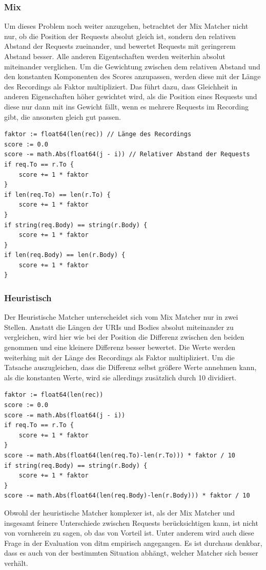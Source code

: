 \documentclass[12pt,a4paper]{report}
\begin{document}
\subsubsection{Mix}
Um dieses Problem noch weiter anzugehen, betrachtet der Mix Matcher nicht nur, ob die Position der Requests absolut gleich
ist, sondern den relativen Abstand der Requests zueinander, und bewertet Requests mit geringerem Abstand besser. Alle
anderen Eigentschaften werden weiterhin absolut miteinander verglichen. Um die Gewichtung zwischen dem relativen Abstand
und den konstanten Komponenten des Scores anzupassen, werden diese mit der Länge des Recordings als Faktor multipliziert.
Das führt dazu, dass Gleichheit in anderen Eigenschaften höher gewichtet wird, als die Position eines Requests und diese
nur dann mit ins Gewicht fällt, wenn es mehrere Requests im Recording gibt, die ansonsten gleich gut passen.
\begin{verbatim}
faktor := float64(len(rec)) // Länge des Recordings
score := 0.0
score -= math.Abs(float64(j - i)) // Relativer Abstand der Requests
if req.To == r.To {
    score += 1 * faktor
}
if len(req.To) == len(r.To) {
    score += 1 * faktor
}
if string(req.Body) == string(r.Body) {
    score += 1 * faktor
}
if len(req.Body) == len(r.Body) {
    score += 1 * faktor
}
\end{verbatim}
\subsubsection{Heuristisch}
Der Heuristische Matcher unterscheidet sich vom Mix Matcher nur in zwei Stellen. Anstatt die Längen der URIs und Bodies
absolut miteinander zu vergleichen, wird hier wie bei der Position die Differenz zwischen den beiden genommen und eine kleinere
Differenz besser bewertet. Die Werte werden weiterhing mit der Länge des Recordings als Faktor multipliziert. Um die Tatsache
auszugleichen, dass die Differenz selbst größere Werte annehmen kann, als die konstanten Werte, wird sie allerdings zusätzlich
durch 10 dividiert.
\begin{verbatim}
faktor := float64(len(rec))
score := 0.0
score -= math.Abs(float64(j - i))
if req.To == r.To {
    score += 1 * faktor
}
score -= math.Abs(float64(len(req.To)-len(r.To))) * faktor / 10
if string(req.Body) == string(r.Body) {
    score += 1 * faktor
}
score -= math.Abs(float64(len(req.Body)-len(r.Body))) * faktor / 10
\end{verbatim}
Obwohl der heuristische Matcher komplexer ist, als der Mix Matcher und insgesamt feinere Unterschiede zwischen Requests
berücksichtigen kann, ist nicht von vornherein zu sagen, ob das von Vorteil ist. Unter anderem wird auch diese Frage in
der Evaluation von ditm empirisch angegangen. Es ist durchaus denkbar, dass es auch von der bestimmten Situation abhängt,
welcher Matcher sich besser verhält.
\end{document}
